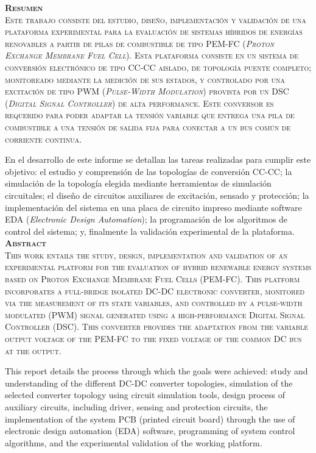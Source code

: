 \Huge
\scshape
\textbf{Resumen}\\

\normalfont\normalsize
Este trabajo consiste del estudio, diseño, implementación y validación de una plataforma experimental para la evaluación de sistemas híbridos de energías renovables a partir de pilas de combustible de tipo PEM-FC (\textit{Proton Exchange Membrane Fuel Cell}). Esta plataforma consiste en un sistema de conversión electrónico de tipo CC-CC aislado, de topología puente completo; monitoreado mediante la medición de sus estados, y controlado por una excitación de tipo PWM (\textit{Pulse-Width Modulation}) provista por un DSC (\textit{Digital Signal Controller}) de alta performance. Este conversor es requerido para poder adaptar la tensión variable que entrega una pila de combustible a una tensión de salida fija para conectar a un bus común de corriente continua. 

En el desarrollo de este informe se detallan las tareas realizadas para cumplir este objetivo: el estudio y comprensión de las topologías de conversión CC-CC; la simulación de la topología elegida mediante herramientas de simulación circuitales; el diseño de circuitos auxiliares de excitación, sensado y protección; la implementación del sistema en una placa de circuito impreso mediante software EDA (\textit{Electronic Design Automation}); la programación de los algoritmos de control del sistema; y, finalmente la validación experimental de la plataforma.\\

\vspace{1cm}
\Huge
\scshape
\textbf{Abstract}\\

\normalsize\normalfont
This work entails the study, design, implementation and validation of an experimental platform for the evaluation of hybrid renewable energy systems based on Proton Exchange Membrane Fuel Cells (PEM-FC). This platform incorporates a full-bridge isolated DC-DC electronic converter, monitored via the measurement of its state variables, and controlled by a pulse-width modulated (PWM) signal generated using a high-performance Digital Signal Controller (DSC). This converter provides the adaptation from the variable output voltage of the PEM-FC to the fixed voltage of the common DC bus at the output.

This report details the process through which the goals were achieved: study and understanding of the different DC-DC converter topologies, simulation of the selected converter topology using circuit simulation tools, design process of auxiliary circuits, including driver, sensing and protection circuits, the implementation of the system PCB (printed circuit board) through the use of electronic design automation (EDA) software, programming of system control algorithms, and the experimental validation of the working platform.\\ 